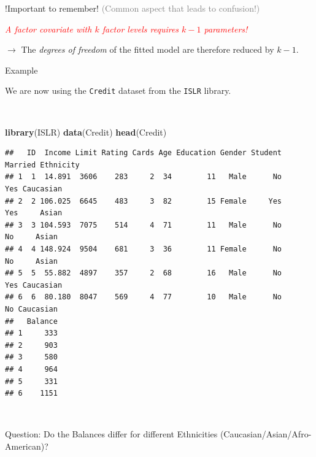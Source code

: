 \documentclass[
  10pt,
  ignorenonframetext,
]{beamer}
\newenvironment{Shaded}{\begin{snugshade}}{\end{snugshade}}
\newcommand{\FunctionTok}[1]{\textcolor[rgb]{0.13,0.29,0.53}{\textbf{#1}}}
\newcommand{\NormalTok}[1]{#1}
\begin{document}
\begin{frame}
\begin{block}{!Important to remember!}
\protect\hypertarget{important-to-remember}{}
\textcolor{gray}{(Common aspect that leads to confusion!)}

\vspace{10mm}

\emph{\textcolor{red}{A factor covariate with $k$ factor levels requires $k-1$ parameters!}}
\vspace{2mm}

\(\rightarrow\) The \emph{degrees of freedom} of the fitted model are
therefore reduced by \(k-1\).
\end{block}
\end{frame}

\begin{frame}[fragile]
\begin{block}{Example}
\protect\hypertarget{example}{}
\(~\)

We are now using the \texttt{Credit} dataset from the \texttt{ISLR}
library.

\(~\)

\scriptsize

\begin{Shaded}
\begin{Highlighting}[]
\FunctionTok{library}\NormalTok{(ISLR)}
\FunctionTok{data}\NormalTok{(Credit)}
\FunctionTok{head}\NormalTok{(Credit)}
\end{Highlighting}
\end{Shaded}

\begin{verbatim}
##   ID  Income Limit Rating Cards Age Education Gender Student Married Ethnicity
## 1  1  14.891  3606    283     2  34        11   Male      No     Yes Caucasian
## 2  2 106.025  6645    483     3  82        15 Female     Yes     Yes     Asian
## 3  3 104.593  7075    514     4  71        11   Male      No      No     Asian
## 4  4 148.924  9504    681     3  36        11 Female      No      No     Asian
## 5  5  55.882  4897    357     2  68        16   Male      No     Yes Caucasian
## 6  6  80.180  8047    569     4  77        10   Male      No      No Caucasian
##   Balance
## 1     333
## 2     903
## 3     580
## 4     964
## 5     331
## 6    1151
\end{verbatim}

\(~\)

\normalsize

Question: Do the Balances differ for different Ethnicities
(Caucasian/Asian/Afro-American)?
\end{block}
\end{frame}
\end{document}
